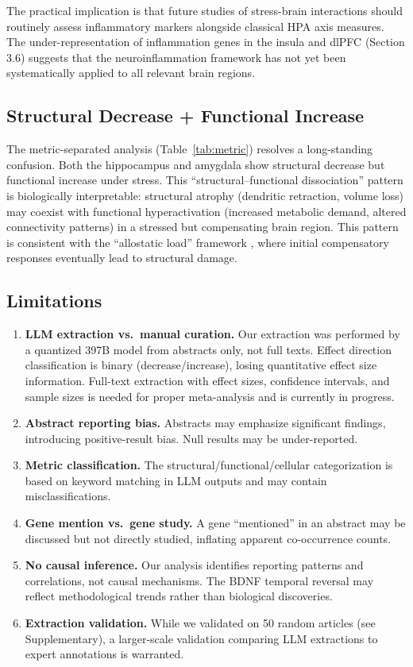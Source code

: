 \documentclass[12pt,a4paper]{article}
\begin{document}
The practical implication is that future studies of stress-brain interactions should routinely assess inflammatory markers alongside classical HPA axis measures. The under-representation of inflammation genes in the insula and dlPFC (Section 3.6) suggests that the neuroinflammation framework has not yet been systematically applied to all relevant brain regions.

\subsection{Structural Decrease + Functional Increase}

The metric-separated analysis (Table~\ref{tab:metric}) resolves a long-standing confusion. Both the hippocampus and amygdala show structural decrease but functional increase under stress. This ``structural--functional dissociation'' pattern is biologically interpretable: structural atrophy (dendritic retraction, volume loss) may coexist with functional hyperactivation (increased metabolic demand, altered connectivity patterns) in a stressed but compensating brain region. This pattern is consistent with the ``allostatic load'' framework \citep{mcewen1999}, where initial compensatory responses eventually lead to structural damage.

\subsection{Limitations}

\begin{enumerate}
    \item \textbf{LLM extraction vs.\ manual curation.} Our extraction was performed by a quantized 397B model from abstracts only, not full texts. Effect direction classification is binary (decrease/increase), losing quantitative effect size information. Full-text extraction with effect sizes, confidence intervals, and sample sizes is needed for proper meta-analysis and is currently in progress.
    \item \textbf{Abstract reporting bias.} Abstracts may emphasize significant findings, introducing positive-result bias. Null results may be under-reported.
    \item \textbf{Metric classification.} The structural/functional/cellular categorization is based on keyword matching in LLM outputs and may contain misclassifications.
    \item \textbf{Gene mention vs.\ gene study.} A gene ``mentioned'' in an abstract may be discussed but not directly studied, inflating apparent co-occurrence counts.
    \item \textbf{No causal inference.} Our analysis identifies reporting patterns and correlations, not causal mechanisms. The BDNF temporal reversal may reflect methodological trends rather than biological discoveries.
    \item \textbf{Extraction validation.} While we validated on 50 random articles (see Supplementary), a larger-scale validation comparing LLM extractions to expert annotations is warranted.
\end{enumerate}
\end{document}
